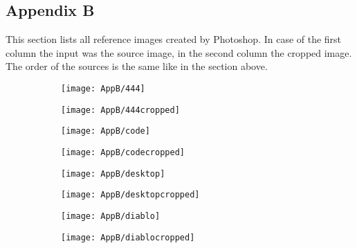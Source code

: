 \documentclass[draft,final]{vutinfth} %
\begin{document}
\begin{appendices}
		\chapter{Appendix B}
		\label{AppB}
		This section lists all reference images created by Photoshop.
		In case of the first column the input was the source image, in the second column the cropped image.
		The order of the sources is the same like in the section above.
		
			\begin{figure}[H]
			\centering
			\begin{subfigure}[b]{0.45\columnwidth}
				\centering
				\texttt{[image: AppB/444]}
			\end{subfigure}
			\begin{subfigure}[b]{0.45\columnwidth}
				\centering
				\texttt{[image: AppB/444cropped]}
			\end{subfigure}
		\end{figure}  
		\begin{figure}[H]
			\centering
			\begin{subfigure}[b]{0.45\columnwidth}
				\centering
				\texttt{[image: AppB/code]}
			\end{subfigure}
			\begin{subfigure}[b]{0.45\columnwidth}
				\centering
				\texttt{[image: AppB/codecropped]}
			\end{subfigure}
		\end{figure}
		\begin{figure}[H]
			\centering
			\begin{subfigure}[b]{0.45\columnwidth}
				\centering
				\texttt{[image: AppB/desktop]}
			\end{subfigure}
			\begin{subfigure}[b]{0.45\columnwidth}
				\centering
				\texttt{[image: AppB/desktopcropped]}
			\end{subfigure}
		\end{figure}
		\begin{figure}[H]
			\centering
			\begin{subfigure}[b]{0.45\columnwidth}
				\centering
				\texttt{[image: AppB/diablo]}
			\end{subfigure}
			\begin{subfigure}[b]{0.45\columnwidth}
				\centering
				\texttt{[image: AppB/diablocropped]}
			\end{subfigure}

\end{figure}
\end{appendices}
\end{document}
